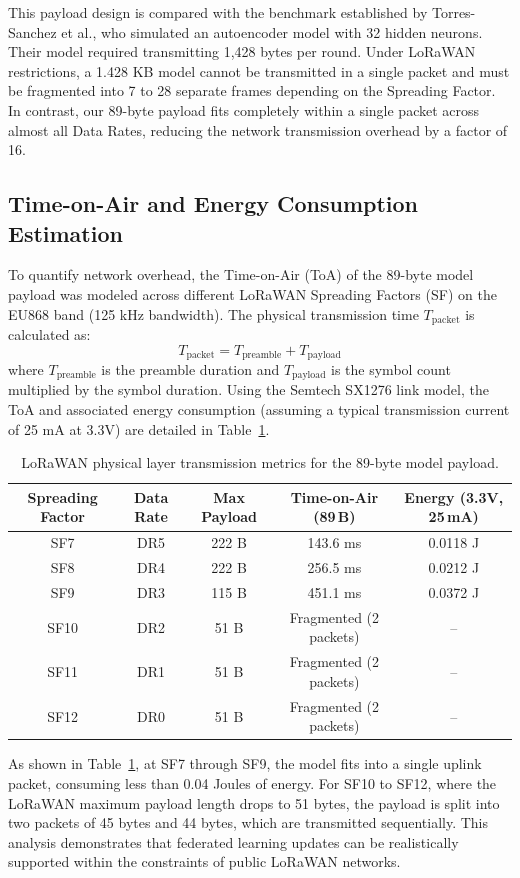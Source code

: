 This payload design is compared with the benchmark established by Torres-Sanchez et al., who simulated an autoencoder model with 32 hidden neurons. Their model required transmitting 1,428 bytes per round. Under LoRaWAN restrictions, a 1.428 KB model cannot be transmitted in a single packet and must be fragmented into 7 to 28 separate frames depending on the Spreading Factor. In contrast, our 89-byte payload fits completely within a single packet across almost all Data Rates, reducing the network transmission overhead by a factor of 16.

\subsection{Time-on-Air and Energy Consumption Estimation}
To quantify network overhead, the Time-on-Air (ToA) of the 89-byte model payload was modeled across different LoRaWAN Spreading Factors (SF) on the EU868 band (125 kHz bandwidth). The physical transmission time $T_{\text{packet}}$ is calculated as:
\begin{equation}
    T_{\text{packet}} = T_{\text{preamble}} + T_{\text{payload}}
\end{equation}
where $T_{\text{preamble}}$ is the preamble duration and $T_{\text{payload}}$ is the symbol count multiplied by the symbol duration.
Using the Semtech SX1276 link model, the ToA and associated energy consumption (assuming a typical transmission current of 25 mA at 3.3V) are detailed in Table~\ref{tab:toa-energy}.

\begin{table}[H]
  \centering
  \begin{tabular}{ccccc}
    \toprule
    \textbf{Spreading Factor} & \textbf{Data Rate} & \textbf{Max Payload} & \textbf{Time-on-Air (89\,B)} & \textbf{Energy (3.3V, 25\,mA)} \\
    \midrule
    SF7  & DR5 & 222 B & 143.6 ms  & 0.0118 J \\
    SF8  & DR4 & 222 B & 256.5 ms  & 0.0212 J \\
    SF9  & DR3 & 115 B & 451.1 ms  & 0.0372 J \\
    SF10 & DR2 & 51 B  & Fragmented (2 packets) & -- \\
    SF11 & DR1 & 51 B  & Fragmented (2 packets) & -- \\
    SF12 & DR0 & 51 B  & Fragmented (2 packets) & -- \\
    \bottomrule
  \end{tabular}
  \caption{LoRaWAN physical layer transmission metrics for the 89-byte model payload.}
  \label{tab:toa-energy}
\end{table}

As shown in Table~\ref{tab:toa-energy}, at SF7 through SF9, the model fits into a single uplink packet, consuming less than 0.04 Joules of energy. For SF10 to SF12, where the LoRaWAN maximum payload length drops to 51 bytes, the payload is split into two packets of 45 bytes and 44 bytes, which are transmitted sequentially. This analysis demonstrates that federated learning updates can be realistically supported within the constraints of public LoRaWAN networks.
